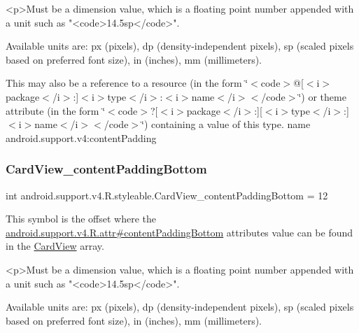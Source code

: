 \begin{DoxyVerb}      <p>Must be a dimension value, which is a floating point number appended with a unit such as "<code>14.5sp</code>".
\end{DoxyVerb}
 Available units are\+: px (pixels), dp (density-\/independent pixels), sp (scaled pixels based on preferred font size), in (inches), mm (millimeters). 

This may also be a reference to a resource (in the form \char`\"{}$<$code$>$@\mbox{[}$<$i$>$package$<$/i$>$\+:\mbox{]}$<$i$>$type$<$/i$>$\+:$<$i$>$name$<$/i$>$$<$/code$>$\char`\"{}) or theme attribute (in the form \char`\"{}$<$code$>$?\mbox{[}$<$i$>$package$<$/i$>$\+:\mbox{]}\mbox{[}$<$i$>$type$<$/i$>$\+:\mbox{]}$<$i$>$name$<$/i$>$$<$/code$>$\char`\"{}) containing a value of this type.  name android.\+support.\+v4\+:content\+Padding \mbox{\label{classandroid_1_1support_1_1v4_1_1R_1_1styleable_a4c12c78d4549a7b68d829d1821c87404}} 
\subsubsection{\texorpdfstring{Card\+View\+\_\+content\+Padding\+Bottom}{CardView\_contentPaddingBottom}}
{\footnotesize\ttfamily int android.\+support.\+v4.\+R.\+styleable.\+Card\+View\+\_\+content\+Padding\+Bottom = 12\hspace{0.3cm}{\ttfamily [static]}}

This symbol is the offset where the \hyperlink{classandroid_1_1support_1_1v4_1_1R_1_1attr_ac85f05250c0d2d5292eeff7d7eb0f798}{android.\+support.\+v4.\+R.\+attr\#content\+Padding\+Bottom} attribute\textquotesingle{}s value can be found in the \hyperlink{classandroid_1_1support_1_1v4_1_1R_1_1styleable_a0e520cd4c78beb0d456e4018c4ba0e86}{Card\+View} array.

\begin{DoxyVerb}      <p>Must be a dimension value, which is a floating point number appended with a unit such as "<code>14.5sp</code>".
\end{DoxyVerb}
 Available units are\+: px (pixels), dp (density-\/independent pixels), sp (scaled pixels based on preferred font size), in (inches), mm (millimeters). 

